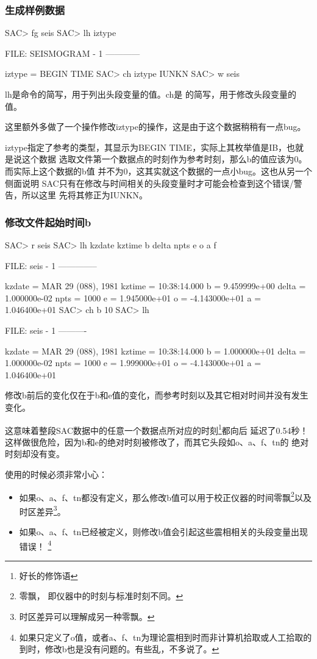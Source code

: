 \subsubsection{生成样例数据}
\begin{SACCode}
SAC> fg seis
SAC> lh iztype

  FILE: SEISMOGRAM - 1
   ------------

    iztype = BEGIN TIME
SAC> ch iztype IUNKN
SAC> w seis
\end{SACCode}
lh是命令的简写，用于列出头段变量的值。ch是
的简写，用于修改头段变量的值。

这里额外多做了一个操作修改iztype的操作，这是由于这个数据稍稍有一点bug。

iztype指定了参考的类型，其显示为BEGIN TIME，实际上其枚举值是IB，也就是说这个数据
选取文件第一个数据点的时刻作为参考时刻，那么b的值应该为0。而实际上这个数据的b值
并不为0，这其实就这个数据的一点小bug。这也从另一个侧面说明
SAC只有在修改与时间相关的头段变量时才可能会检查到这个错误/警告，所以这里
先将其修正为IUNKN。

\subsubsection{修改文件起始时间b}
\begin{SACCode}
SAC> r seis
SAC> lh kzdate kztime b delta npts e o a f
  
  FILE: seis - 1
 --------------

     kzdate = MAR 29 (088), 1981
     kztime = 10:38:14.000
          b = 9.459999e+00
      delta = 1.000000e-02
       npts = 1000
          e = 1.945000e+01
          o = -4.143000e+01
          a = 1.046400e+01
SAC> ch b 10
SAC> lh
  
  FILE: seis - 1
   ----------

     kzdate = MAR 29 (088), 1981
     kztime = 10:38:14.000
          b = 1.000000e+01
      delta = 1.000000e-02
       npts = 1000
          e = 1.999000e+01
          o = -4.143000e+01
          a = 1.046400e+01
\end{SACCode}

修改b前后的变化仅在于b和e值的变化，而参考时刻以及其它相对时间并没有发生变化。

这意味着整段SAC数据中的任意一个数据点所对应的时刻\footnote{好长的修饰语}都向后
延迟了0.54秒！这样做很危险，因为b和e的绝对时刻被修改了，而其它头段如o、a、f、tn的
绝对时刻却没有变。

使用的时候必须非常小心：
\begin{itemize}
\item 如果o、a、f、tn都没有定义，那么修改b值可以用于校正仪器的时间零飘\footnote{零飘，
    即仪器中的时刻与标准时刻不同。}以及时区差异\footnote{时区差异可以理解成另一种零飘。}。
\item 如果o、a、f、tn已经被定义，则修改b值会引起这些震相相关的头段变量出现错误！
    \footnote{如果只定义了o值，或者a、f、tn为理论震相到时而非计算机拾取或人工拾取的
    到时，修改b也是没有问题的。有些乱，不多说了。}
\end{itemize}

